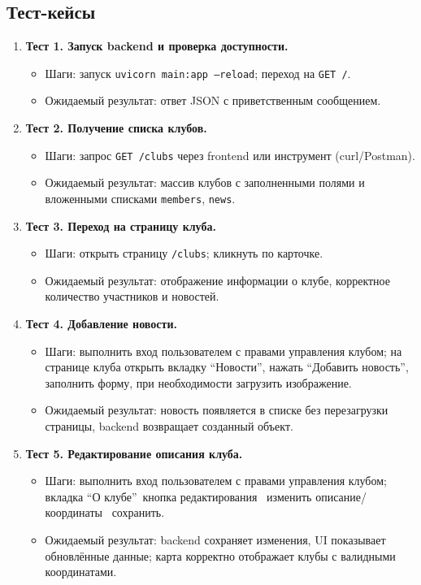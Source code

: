 \documentclass[utf8, russian]{eskdtext}
\begin{document}
\subsection{Тест-кейсы}
\begin{enumerate}
  \item \textbf{Тест 1. Запуск backend и проверка доступности.}
  \begin{itemize}
    \item Шаги: запуск \texttt{uvicorn main:app --reload}; переход на \texttt{GET /}.
    \item Ожидаемый результат: ответ JSON с приветственным сообщением.
  \end{itemize}

  \item \textbf{Тест 2. Получение списка клубов.}
  \begin{itemize}
    \item Шаги: запрос \texttt{GET /clubs} через frontend или инструмент (curl/Postman).
    \item Ожидаемый результат: массив клубов с заполненными полями и вложенными списками \texttt{members}, \texttt{news}.
  \end{itemize}

  \item \textbf{Тест 3. Переход на страницу клуба.}
  \begin{itemize}
    \item Шаги: открыть страницу \texttt{/clubs}; кликнуть по карточке.
    \item Ожидаемый результат: отображение информации о клубе, корректное количество участников и новостей.
  \end{itemize}

  \item \textbf{Тест 4. Добавление новости.}
  \begin{itemize}
    \item Шаги: выполнить вход пользователем с правами управления клубом; на странице клуба открыть вкладку \textquotedblleft Новости\textquotedblright , нажать \textquotedblleft Добавить новость\textquotedblright , заполнить форму, при необходимости загрузить изображение.
    \item Ожидаемый результат: новость появляется в списке без перезагрузки страницы, backend возвращает созданный объект.
  \end{itemize}

  \item \textbf{Тест 5. Редактирование описания клуба.}
  \begin{itemize}
    \item Шаги: выполнить вход пользователем с правами управления клубом; вкладка \textquotedblleft О клубе\textquotedblright  \textrightarrow\ кнопка редактирования \textrightarrow\ изменить описание/координаты \textrightarrow\ сохранить.
    \item Ожидаемый результат: backend сохраняет изменения, UI показывает обновлённые данные; карта корректно отображает клубы с валидными координатами.
  \end{itemize}


\end{enumerate}
\end{document}
